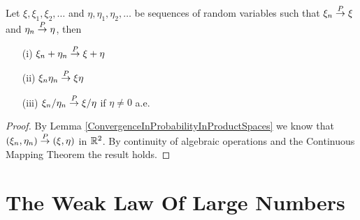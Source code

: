 \begin{cor}\label{ConvergenceInProbabilityAndAlgebraicOperations}Let $\xi, \xi_1, \xi_2, \dots$ and $\eta, \eta_1, \eta_2,
  \dots$ be sequences of random variables such that $\xi_n \overset{P}\to
  \xi$ and $\eta_n \overset{P}\to \eta$, then 
\begin{itemize}
\item[(i)] $\xi_n + \eta_n \overset{P}\to \xi + \eta$
\item[(ii)] $\xi_n  \eta_n \overset{P}\to \xi \eta$
\item[(iii)] $\xi_n / \eta_n \overset{P}\to \xi /\eta$ if $\eta \neq 0$ a.e.
\end{itemize}
\end{cor}
\begin{proof}
By Lemma \ref{ConvergenceInProbabilityInProductSpaces} we know that
$(\xi_n, \eta_n) \overset{P}\to (\xi, \eta)$ in $\mathbb{R}^2$.  By continuity of algebraic
operations and the Continuous Mapping Theorem the result holds.
\end{proof}


\section{The Weak Law Of Large Numbers}

